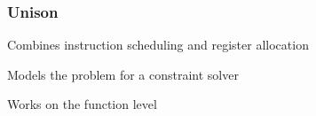 \begin{frame}
	\frametitle{Unison}
	
	Combines instruction scheduling and register allocation

	\vspace{0.5cm}

	Models the problem for a constraint solver

	\vspace{0.5cm}

	Works on the function level

\end{frame}
